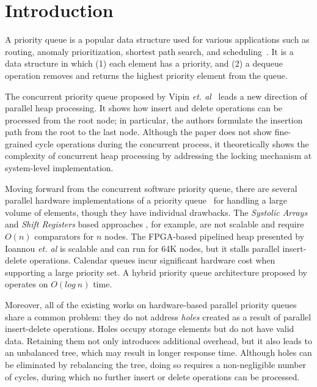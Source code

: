 \section{Introduction}
A priority queue is a popular data structure used for various applications such as routing, anomaly prioritization, shortest path search, and scheduling~\cite{ah1,ah2,ah3}.
It is a data structure in which (1) each element has a priority, and (2) a dequeue operation removes and returns the highest priority element from the queue.

The concurrent priority queue proposed by Vipin {\it et. al}~\cite{pq6} leads a new direction of parallel heap processing. 
It shows how insert and delete operations can be processed from the root node; in particular, the authors formulate the insertion path from the root to the last node. 
Although the paper does not show fine-grained cycle operations during the concurrent process, it theoretically shows the complexity of concurrent heap processing by addressing the locking mechanism at system-level implementation.

Moving forward from the concurrent software priority queue, there are several parallel hardware implementations of a priority queue~\cite{hw1,hw2,hw8,hw9,fpga1,fpga2,fpga3} for handling a large volume of elements, though they have individual drawbacks.
The {\it Systolic Arrays} and {\it Shift Registers} based approaches \cite{hw8,hw9}, for example, are not scalable and require $O(n)$ comparators for $n$ nodes.
The FPGA-based pipelined heap presented by Ioannou {\it et. al} \cite{fpga1} is scalable and can run for 64K nodes, but it stalls parallel insert-delete operations. Calendar queues \cite{hw1} incur significant hardware cost when supporting a large priority set. A hybrid priority queue architecture proposed by \cite{hwsw1} operates on $O(log \ n)$ time.

Moreover, all of the existing works on hardware-based parallel priority queues share a common problem: they do not address {\it holes} created as a result of parallel insert-delete operations. 
Holes occupy storage elements but do not have valid data. 
Retaining them not only introduces additional overhead, but it also leads to an unbalanced tree, which may result in longer response time.
Although holes can be eliminated by rebalancing the tree, doing so requires a non-negligible number of cycles, during which no further insert or delete operations can be processed.

